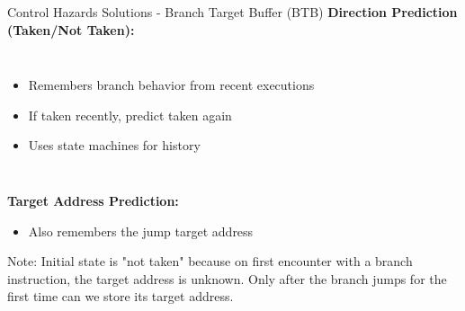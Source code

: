 \documentclass[aspectratio=169,12pt]{beamer}
\begin{document}
\begin{frame}{Control Hazards Solutions - Branch Target Buffer (BTB)}
\textbf{Direction Prediction (Taken/Not Taken):}
\begin{columns}
\begin{itemize}
    \item Remembers branch behavior from recent executions
    \item If taken recently, predict taken again
    \item Uses state machines for history
\end{itemize}

\end{columns}
\vspace{0.5cm}
\textbf{Target Address Prediction:}
\begin{itemize}
    \item Also remembers the jump target address
\end{itemize}

\begin{tcolorbox}[colback=yellow!10]
\small
Note: Initial state is "not taken" because on first encounter with a branch instruction, the target address is unknown. Only after the branch jumps for the first time can we store its target address.
\end{tcolorbox}
\end{frame}
\end{document}
